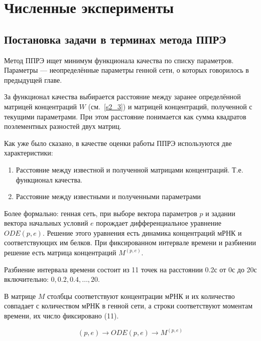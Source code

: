 \clearpage
\section{Численные эксперименты} \label{s3}

\subsection{Постановка задачи в терминах метода ППРЭ} \label{s3_1}

Метод ППРЭ ищет минимум функционала качества по списку параметров. Параметры — 
неопределённые параметры генной сети, о которых говорилось в предыдущей главе. 

За функционал качества выбирается расстояние между заранее определённой матрицей 
концентраций $W$ (см.~\ref{s2_3}) и матрицей концентраций, полученной с текущими 
параметрами. При этом расстояние понимается как сумма квадратов поэлементных 
разностей двух матриц. 

Как уже было сказано, в качестве оценки работы ППРЭ используются две 
характеристики: 
\begin{enumerate}
	\item Расстояние между известной и полученной матрицами концентраций. Т.е. 
	функционал качества.
	\item Расстояние между известными и полученными параметрами
\end{enumerate}

Более формально: генная сеть, при выборе вектора параметров $p$ и задании
вектора начальных условий $e$ порождает дифференциальное уравнение $ODE(p,e)$.
Решение этого уравнения есть динамика концентраций мРНК и 
соответствующих им белков. При фиксированном интервале времени и разбиении 
решение есть матрица концентраций $M^{(p,e)}$.

Разбиение интервала времени состоит из 11 точек на расстоянии 0.2с от 0с до 20с 
включительно: $0, 0.2, 0.4, \dots, 20$.

В матрице $M$ столбцы соответствуют концентрации мРНК и их количество совпадает
с количеством мРНК в генной сети, а строки соответствуют моментам времени, 
их число фиксировано (11).

\[ (p,e) \rightarrow ODE(p,e) \rightarrow M^{(p,e)} \]

